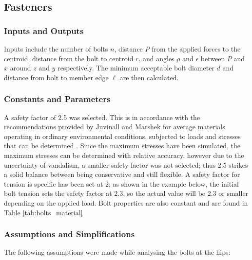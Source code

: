 \subsection{Fasteners} \label{subsec:bolt_analysis}


\subsubsection{Inputs and Outputs}

Inputs include the number of bolts $n$, distance $P$ from the applied forces to the centroid, distance from the bolt to centroid $r$, and angles $\rho$ and $\epsilon$ between $P$ and $x$ around $z$ and $y$ respectively.
The minimum acceptable bolt diameter $d$ and distance from bolt to member edge $\ell$ are then calculated.


\subsubsection{Constants and Parameters}

A safety factor of 2.5 was selected.
This is in accordance with the recommendations provided by Juvinall and Marshek for average materials operating in ordinary environmental conditions, subjected to loads and stresses that can be determined \cite{juvinall_fundamentals_2012}.
Since the maximum stresses have been simulated, the maximum stresses can be determined with relative accuracy, however due to the uncertainty of vandalism, a smaller safety factor was not selected; thus 2.5 strikes a solid balance between being conservative and still flexible.
A safety factor for tension is specific has been set at 2; as shown in the example below, the initial bolt tension sets the safety factor at $2.3$, so the actual value will be $2.3$ or smaller depending on the applied load.
Bolt properties are also constant and are found in Table \ref{tab:bolts_material}


\subsubsection{Assumptions and Simplifications}

The following assumptions were made while analysing the bolts at the hips:

